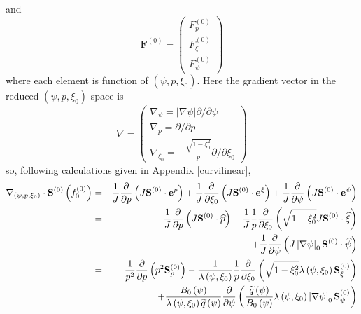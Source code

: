 and
\begin{equation}
\mathbf{F}^{\left( 0\right) }=\left(
\begin{array}{l}
F_{p}^{\left( 0\right) } \\
F_{\xi }^{\left( 0\right) } \\
F_{\psi }^{\left( 0\right) }
\end{array}
\right)
\end{equation}
where each element is function of $\left( \psi ,p,\xi _{0}\right) $. Here
the gradient vector in the reduced $\left( \psi ,p,\xi _{0}\right) $ space
is
\begin{equation}
\nabla =\left(
\begin{array}{l}
\nabla _{\psi }=\left| \nabla \psi \right| \partial /\partial \psi  \\
\nabla _{p}=\partial /\partial p \\
\nabla _{\xi _{0}}=-\frac{\sqrt{1-\xi _{0}^{2}}}{p}\partial /\partial \xi
_{0}
\end{array}
\right)
\end{equation}
so, following calculations given in Appendix \ref{curvilinear},
\begin{eqnarray}
\nabla _{\left( \psi ,p,\xi _{0}\right) }\cdot \mathbf{S}^{\left( 0\right)
}\left( f_{0}^{\left( 0\right) }\right)  &=&\frac{1}{J}\frac{\partial }{%
\partial p}\left( J\mathbf{S}^{\left( 0\right) }\cdot \mathbf{e}^{p}\right) +%
\frac{1}{J}\frac{\partial }{\partial \xi _{0}}\left( J\mathbf{S}^{\left(
0\right) }\cdot \mathbf{e}^{\xi }\right) +\frac{1}{J}\frac{\partial }{%
\partial \psi }\left( J\mathbf{S}^{\left( 0\right) }\cdot \mathbf{e}^{\psi
}\right)   \nonumber \\
&=&\frac{1}{J}\frac{\partial }{\partial p}\left( J\mathbf{S}^{\left(
0\right) }\cdot \widehat{p}\right) -\frac{1}{J}\frac{1}{p}\frac{\partial }{%
\partial \xi _{0}}\left( \sqrt{1-\xi _{0}^{2}}J\mathbf{S}^{\left( 0\right) }%
\cdot \widehat{\xi }\right)   \nonumber \\
&&+\frac{1}{J}\frac{\partial }{\partial \psi }\left( J\left| \nabla \psi
\right| _{0}\mathbf{S}^{\left( 0\right) }\cdot \widehat{\psi }\right)
\nonumber \\
&=&\frac{1}{p^{2}}\frac{\partial }{\partial p}\left( p^{2}\mathbf{S}%
_{p}^{\left( 0\right) }\right) -\frac{1}{\lambda \left( \psi ,\xi
_{0}\right) }\frac{1}{p}\frac{\partial }{\partial \xi _{0}}\left( \sqrt{%
1-\xi _{0}^{2}}\lambda \left( \psi ,\xi _{0}\right) \mathbf{S}_{\xi
}^{\left( 0\right) }\right)   \nonumber \\
&&+\frac{B_{0}\left( \psi \right) }{\lambda \left( \psi ,\xi _{0}\right)
\widetilde{q}\left( \psi \right) }\frac{\partial }{\partial \psi }\left(
\frac{\widetilde{q}\left( \psi \right) }{B_{0}\left( \psi \right) }\lambda
\left( \psi ,\xi _{0}\right) \left| \nabla \psi \right| _{0}\mathbf{S}_{\psi
}^{\left( 0\right) }\right)
\end{eqnarray}
